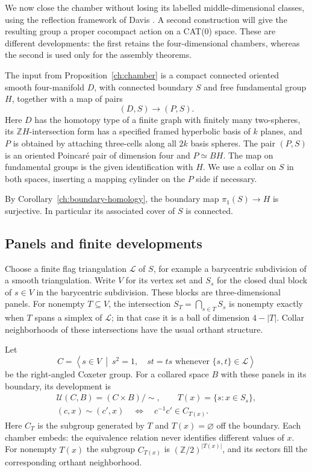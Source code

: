 \documentclass[11pt]{article}
\theoremstyle{definition}
\theoremstyle{remark}
\newcommand{\Z}{\mathbb Z}
\begin{document}
We now close the chamber without losing its labelled middle-dimensional
classes, using the reflection framework of Davis
\cite[Sections~13 and~15, especially Remark~15.9]{Davis1983}.
A second construction will give the resulting group a proper
cocompact action on a CAT(0) space.  These are different developments:
the first retains the four-dimensional chambers, whereas the second is
used only for the assembly theorems.

The input from Proposition~\ref{ch:chamber} is a compact connected oriented
smooth four-manifold $D$, with connected boundary $S$ and free fundamental
group $H$, together with a map of pairs
\[
 (D,S)\longrightarrow(P,S).
\]
Here $D$ has the homotopy type of a finite graph with finitely many
two-spheres, its $\Z H$-intersection form has a specified framed
hyperbolic basis of $k$ planes, and $P$ is obtained by attaching
three-cells along all $2k$ basis spheres.  The pair $(P,S)$ is an
oriented Poincar\'e pair of dimension four and $P\simeq BH$.
The map on fundamental groups is the given identification with $H$.
We use a collar on $S$ in both spaces, inserting a mapping cylinder
on the $P$ side if necessary.

By Corollary~\ref{ch:boundary-homology}, the boundary map
$\pi_1(S)\to H$ is surjective.  In particular its associated cover of
$S$ is connected.

\subsection{Panels and finite developments}
\label{rf:panels}

Choose a finite flag triangulation $\mathcal L$ of $S$, for example a
barycentric subdivision of a smooth triangulation.  Write $V$ for its
vertex set and $S_s$ for the closed dual block of $s\in V$ in the
barycentric subdivision.  These blocks are three-dimensional panels.
For nonempty $T\subseteq V$, the intersection $S_T=\bigcap_{s\in T}S_s$ is nonempty exactly when
$T$ spans a simplex of $\mathcal L$; in that case it is a ball of
dimension $4-|T|$.  Collar neighborhoods of these intersections have
the usual orthant structure.

Let
\[
 C=\left\langle s\in V\ \middle|\ s^2=1,\quad
 st=ts\text{ whenever }\{s,t\}\in\mathcal L\right\rangle
\]
be the right-angled Coxeter group.  For a collared space $B$ with these
panels in its boundary, its development is
\[
 \begin{gathered}
 \mathcal U(C,B)=(C\times B)/\sim,
 \qquad T(x)=\{s:x\in S_s\},\\
 (c,x)\sim(c',x)\quad\Longleftrightarrow\quad
 c^{-1}c'\in C_{T(x)}.
 \end{gathered}
\]
Here $C_T$ is the subgroup generated by $T$ and $T(x)=\varnothing$
off the boundary.  Each chamber embeds: the equivalence relation never
identifies different values of $x$.  For nonempty $T(x)$ the subgroup
$C_{T(x)}$ is $(\Z/2)^{|T(x)|}$, and its sectors fill the corresponding
orthant neighborhood.
\end{document}
